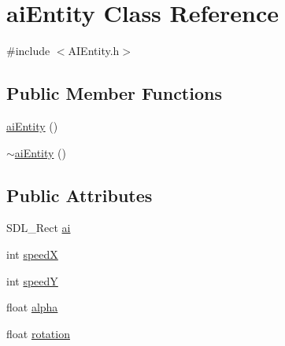 \hypertarget{classai_entity}{\section{ai\-Entity Class Reference}
\label{classai_entity}
}


{\ttfamily \#include $<$A\-I\-Entity.\-h$>$}

\subsection*{Public Member Functions}
\begin{DoxyCompactItemize}
\item 
\hyperlink{classai_entity_a128ae1e6800c22566c5b82a952ee1aba}{ai\-Entity} ()
\item 
\hyperlink{classai_entity_a21ebfb4b6666c4e5d8b5ac3a7e53aac1}{$\sim$ai\-Entity} ()
\end{DoxyCompactItemize}
\subsection*{Public Attributes}
\begin{DoxyCompactItemize}
\item 
S\-D\-L\-\_\-\-Rect \hyperlink{classai_entity_a71798529cfeef539f170a810a4e2e05d}{ai}
\item 
int \hyperlink{classai_entity_aee66c693af00696139c2b8645f2e477a}{speed\-X}
\item 
int \hyperlink{classai_entity_a2d8ad66d0365d4e73833fe85604473a3}{speed\-Y}
\item 
float \hyperlink{classai_entity_ab10f9085050a47cd2e2d672f033260c0}{alpha}
\item 
float \hyperlink{classai_entity_a00bd1c27c4f5596b6faa7b60cab4b1c1}{rotation}
\end{DoxyCompactItemize}



